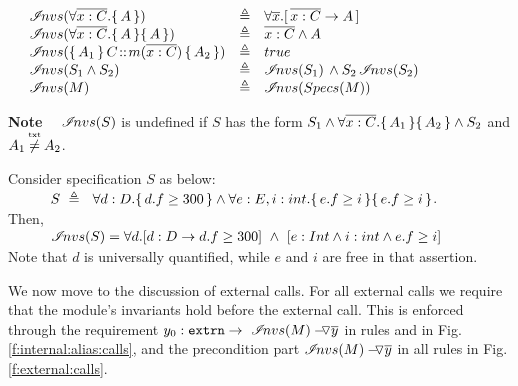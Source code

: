 {\begin{definition}
\label{def:extract}
$
\begin{array}{clcl}
& \extract{ \OneStateQ{\overline {x:C}}{A} }  & \triangleq & \forall \overline{x}.[ \, \overline {x:C} \rightarrow A \, ]
\\
& \extract{ \TwoStatesQ{\overline {x:C}}{A}{A} }  & \triangleq & \overline {x:C} \wedge A  
\\
& \extract { {\mprepost{A_1}{C}{m}{x}{C}{A_2} } } & \triangleq & true
\\
& \extract{ S_1 \wedge S_2 } & \triangleq & \extract{ S_1} \, \wedge S_2 \,  \extract{ S_2 }
\\
&  \extract{ M }  & \triangleq &  \extract{ \specs M }
\end{array}
$
\end{definition}

\noindent 
\textbf{Note}  \ \  $\extract{S}$ is undefined if  $S$ has the form $S_1\wedge \TwoStatesQ{\overline {x:C}}{A_1}{A_2}   \wedge S_2$
and $ A_1  \txtneq  A_2$.

 \begin{example}
 \label{example:extract}
  Consider specification $S$ %
   as below: \\
$\strut \ \ \  \ \ \ \ \ \ S \ \triangleq\ \ \OneStateQ{d:D}{d.f\geq 300} \wedge  \TwoStatesQ{e:E,i:int}{e.f\geq i} {e.f\geq i} $. 
\\
Then,\\ %
$\strut \ \ \  \ \ \ \ \ \ \extract{S}  = \forall d.[d:D \rightarrow d.f\geq 300]\ \wedge \  [ e:Int \wedge i:int \wedge e.f \geq i]$
\\
Note that $d$ is universally quantified, while $e$ and $i$ are free in that assertion.
 \end{example}



{We now move to the discussion of  external calls. For all external calls we require that the module's invariants hold before the external call.
This is enforced through the requirement ${\external{y_0}}  \rightarrow \  \PushAS {y}{\extract{M}}$ in rules
{} and {} in  Fig. \ref{f:internal:alias:calls}, and the precondition part  
 $\PushAS {y}{\extract{M}}$ in all rules in Fig.  \ref{f:external:calls}. }


}
